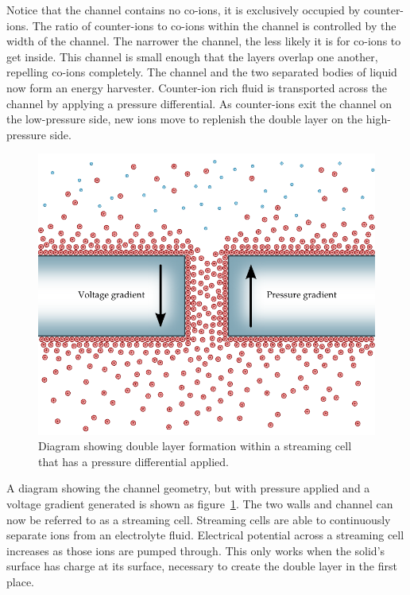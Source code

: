  Notice that the channel contains no co-ions, it is exclusively occupied by counter-ions.
  The ratio of counter-ions to co-ions within the channel is controlled by the width of the channel.
  The narrower the channel, the less likely it is for co-ions to get inside.
  This channel is small enough that the layers overlap one another, repelling co-ions completely.
  The channel and the two separated bodies of liquid now form an energy harvester.
  Counter-ion rich fluid is transported across the channel by applying a pressure differential.
  As counter-ions exit the channel on the low-pressure side, new ions move to replenish the double layer on the high-pressure side.
  \begin{figure}[t]
      \centering
      \includegraphics{content/pt1/01-PowerHarvesting/graphics/intro_2_channel}
      \caption{\label{fig:doubleLayerInChannel_withPressure}Diagram showing double layer formation within a streaming cell that has a pressure differential applied.}
  \end{figure}
  A diagram showing the channel geometry, but with pressure applied and a voltage gradient generated is shown as figure~\ref{fig:doubleLayerInChannel_withPressure}.
  The two walls and channel can now be referred to as a streaming cell.
  Streaming cells are able to continuously separate ions from an electrolyte fluid.
  Electrical potential across a streaming cell increases as those ions are pumped through.
  This only works when the solid's surface has charge at its surface, necessary to create the double layer in the first place.

